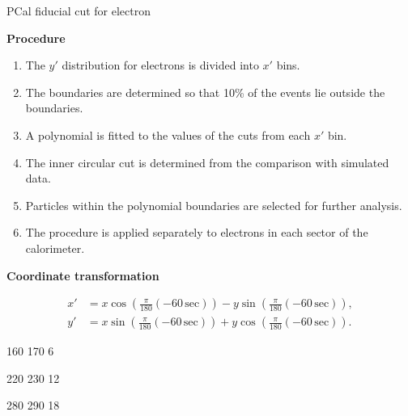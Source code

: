 \begin{frame}{PCal fiducial cut for electron}

    \textcolor{myblue}{\textbf{Procedure}}
    
    \begin{enumerate}
        \item The $y'$ distribution for electrons is divided into $x'$ bins.
    
        \item The boundaries are determined so that 10\% of the events
        lie outside the boundaries.
    
        \item A polynomial is fitted to the values of the cuts from
        each $x'$ bin.
    
        \item The inner circular cut is determined from the comparison
        with simulated data.
    
        \item Particles within the polynomial boundaries are selected
        for further analysis.

        \item The procedure is applied separately to electrons in each sector of the calorimeter.
    \end{enumerate}
    
    \vspace{0.1cm}
    
    \textcolor{myblue}{\textbf{Coordinate transformation}}
    
    \[
    \begin{aligned}
    x' &= x\cos\left(
        \frac{\pi}{180}(-60\,\mathrm{sec})
        \right)
        - y\sin\left(
        \frac{\pi}{180}(-60\,\mathrm{sec})
        \right),
    \\[0.1cm]
    y' &= x\sin\left(
        \frac{\pi}{180}(-60\,\mathrm{sec})
        \right)
        + y\cos\left(
        \frac{\pi}{180}(-60\,\mathrm{sec})
        \right).
    \end{aligned}
    \]

\end{frame}

\YPrimeDistributionSlide
    {160}
    {170}
    {6}

\YPrimeDistributionSlide
    {220}
    {230}
    {12}

\YPrimeDistributionSlide
    {280}
    {290}
    {18}

